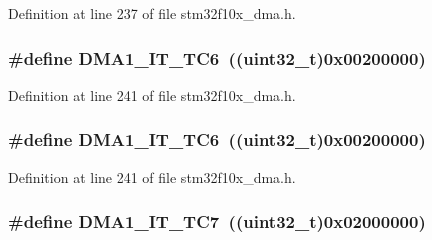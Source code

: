 Definition at line 237 of file stm32f10x\+\_\+dma.\+h.

\subsubsection[{\texorpdfstring{D\+M\+A1\+\_\+\+I\+T\+\_\+\+T\+C6}{DMA1_IT_TC6}}]{\setlength{\rightskip}{0pt plus 5cm}\#define D\+M\+A1\+\_\+\+I\+T\+\_\+\+T\+C6~(({\bf uint32\+\_\+t})0x00200000)}\hypertarget{group___d_m_a__interrupts__definition_ga466bad6bf0a2c115aee96d2a1e3b8ddf}{}\label{group___d_m_a__interrupts__definition_ga466bad6bf0a2c115aee96d2a1e3b8ddf}


Definition at line 241 of file stm32f10x\+\_\+dma.\+h.

\subsubsection[{\texorpdfstring{D\+M\+A1\+\_\+\+I\+T\+\_\+\+T\+C6}{DMA1_IT_TC6}}]{\setlength{\rightskip}{0pt plus 5cm}\#define D\+M\+A1\+\_\+\+I\+T\+\_\+\+T\+C6~(({\bf uint32\+\_\+t})0x00200000)}\hypertarget{group___d_m_a__interrupts__definition_ga466bad6bf0a2c115aee96d2a1e3b8ddf}{}\label{group___d_m_a__interrupts__definition_ga466bad6bf0a2c115aee96d2a1e3b8ddf}


Definition at line 241 of file stm32f10x\+\_\+dma.\+h.

\subsubsection[{\texorpdfstring{D\+M\+A1\+\_\+\+I\+T\+\_\+\+T\+C7}{DMA1_IT_TC7}}]{\setlength{\rightskip}{0pt plus 5cm}\#define D\+M\+A1\+\_\+\+I\+T\+\_\+\+T\+C7~(({\bf uint32\+\_\+t})0x02000000)}\hypertarget{group___d_m_a__interrupts__definition_ga17efb3180f536c295853e64e5ca508c2}{}\label{group___d_m_a__interrupts__definition_ga17efb3180f536c295853e64e5ca508c2}


